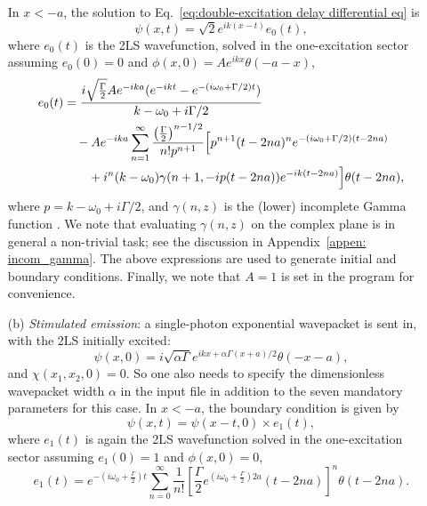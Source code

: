 \documentclass[12pt,letter,onecolumn,notitlepage]{article}
\begin{document}
\begin{enumerate}
In $x<-a$, the solution to Eq.~\eqref{eq:double-excitation delay differential eq} is 
\begin{equation}
\psi(x,t) = \sqrt{2}e^{ik(x-t)}e_0(t), 
\label{eq: BC two-photon scattering}
\end{equation}
where $e_0(t)$ is the 2LS wavefunction, solved in the one-excitation sector assuming $e_0(0)=0$ and $\phi(x, 0)=A e^{ikx}\theta(-a-x)$,
\begin{align}
 e_0(t)&=\frac{i\sqrt{\frac{\Gamma}{2}} Ae^{-ika}(e^{-ikt}-e^{-(i\omega_0+\Gamma/2)t})}{k-\omega_0+i\Gamma/2}\nonumber\\
 &\quad- Ae^{-ika} \sum_{n=1}^{\infty}\frac{\left(\frac{\Gamma}{2}\right)^{n-1/2}}{n!p^{n+1}}
 \Bigl[p^{n+1}(t-2na)^n e^{-(i\omega_0+\Gamma/2)(t-2na)}\nonumber\\
 &\quad\quad+i^n(k-\omega_0)\gamma(n+1,-ip(t-2na))e^{-ik(t-2na)}
 \Bigr]\theta(t-2na),
 \label{eq:exact solution single-photon scattering}
\end{align}
where $p=k-\omega_0+i\Gamma/2$, and $\gamma(n, z)$ is the (lower) incomplete Gamma function \cite{NISThandbook}. We note that evaluating $\gamma(n, z)$ on the complex plane is in general a non-trivial task; see the discussion in Appendix~\ref{appen: incom_gamma}.
The above expressions are used to generate initial and boundary conditions. Finally, we note that $A=1$ is set in the program for convenience.
    \item[(b)] \textit{Stimulated emission}: a single-photon exponential wavepacket is sent in, with the 2LS initially excited:
\begin{equation}
	\psi(x,0)=i\sqrt{\alpha \Gamma} e^{ikx+\alpha\Gamma(x+a)/2}\theta(-x-a),
	\label{eq:single-photon exponential wavepacket}
\end{equation}
and $\chi(x_1, x_2, 0)=0$. So one also needs to specify the dimensionless wavepacket width $\alpha$ in the input file in addition to the seven mandatory parameters for this case. In $x<-a$, the boundary condition is given by 
\begin{equation}
\psi(x,t) = \psi(x-t, 0)\times e_1(t),
\end{equation}
where $e_1(t)$ is again the 2LS wavefunction solved in the one-excitation sector assuming $e_1(0)=1$ and $\phi(x, 0) =0$,
\begin{equation}
e_1(t)=e^{-(i\omega_0+\frac{\Gamma}{2})t}\sum_{n=0}^{\infty}\frac{1}{n!}\left[\frac{\Gamma}{2}e^{(i\omega_0+\frac{\Gamma}{2})2a}(t-2na)\right]^n\theta(t-2na).
\label{eq:spontaneous emission solution}
\end{equation}
\end{enumerate}
\end{document}
